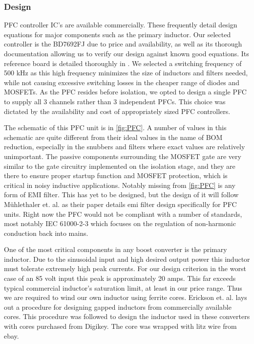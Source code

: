 \documentclass[15pt]{article}
\begin{document}
\subsubsection{Design}
PFC controller IC’s are available commercially. These frequently detail design equations for major components such as the primary inductor. Our selected controller is the BD7692FJ due to price and availability, as well as its thorough documentation allowing us to verify our design against known good equations. Its reference board is detailed thoroughly in \cite{1}. We selected a switching frequency of 500 kHz as this high frequency minimizes the size of inductors and filters needed, while not causing excessive switching losses in the cheaper range of diodes and MOSFETs. As the PFC resides before isolation, we opted to design a single PFC to supply all 3 channels rather than 3 independent PFCs. This choice was dictated by the availability and cost of appropriately sized PFC controllers.

The schematic of this PFC unit is in \autoref{fig:PFC}. A number of values in this schematic are quite different from their ideal values in the name of BOM reduction, especially in the snubbers and filters where exact values are relatively unimportant. The passive components surrounding the MOSFET gate are very similar to the gate circuitry implemented on the isolation stage, and they are there to ensure proper startup function and MOSFET protection, which is critical in noisy inductive applications. Notably missing from \autoref{fig:PFC} is any form of EMI filter. This has yet to be designed, but the design of it will follow Mühlethaler et. al.\cite{8} as their paper details emi filter design specifically for PFC units. Right now the PFC would not be compliant with a number of standards, most notably IEC 61000-2-3 \cite{3} which focuses on the regulation of non-harmonic conduction back into mains.

One of the most critical components in any boost converter is the primary inductor. Due to the sinusoidal input and high desired output power this inductor must tolerate extremely high peak currents. For our design criterion in the worst case of an 85 volt input this peak is approximately 20 amps. This far exceeds typical commercial inductor’s saturation limit, at least in our price range. Thus we are required to wind our own inductor using ferrite cores. Erickson et. al.\cite{2} lays out a procedure for designing gapped inductors from commercially available cores. This procedure was followed to design the inductor used in these converters with cores purchased from Digikey. The core was wrapped with litz wire from ebay.
\end{document}
